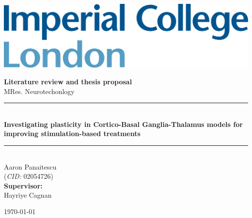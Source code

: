 



\begin{titlepage}
	\newcommand{\HRule}{\rule{\linewidth}{0.5mm}}
	\setlength{\topmargin}{0in}
	\center

	\begin{flushleft} \large
		\begin{minipage}{0.4\textwidth}
			\includegraphics[scale=0.14]{imperial.png}
		\end{minipage}
	\end{flushleft}
	\vspace{4cm}

	\textbf{\large Literature review and thesis proposal}\\[0.1cm]
	{\large MRes. Neurotechonlogy}\\[0.5cm]

	\HRule \\[0.4cm]
	{\Large \bfseries Investigating plasticity in Cortico-Basal Ganglia-Thalamus models for improving stimulation-based treatments }
	\HRule \\[1cm]


	{\large Aaron Panaitescu \\
	(\textit{CID:} 02054726) \\[0.4cm]
	\textbf{Supervisor:} \\
	Hayriye Cagnan}


	\vfill
	{\large \today}\\[0.8cm]
\end{titlepage}
\tableofcontents
\newpage

